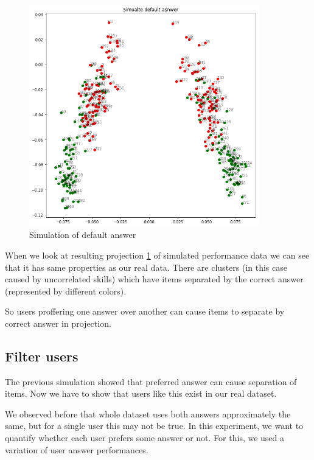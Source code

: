 \documentclass[
  digital, %
  table,   %
  nolof,     %
  nolot,     %
  nocover
]{fithesis3}
\begin{document}
\begin{figure}
  \includegraphics[width=10cm]{img/simulated_default}
  \caption{Simulation of default answer}
  \label{fig:simulated_default}
\end{figure}

When we look at resulting projection \ref{fig:simulated_default} of simulated performance data we can see that it has same properties as our real data. There are clusters (in this case caused by uncorrelated skills) which have items separated by the correct answer (represented by different colors).


So users proffering one answer over another can cause items to separate by correct answer in projection.


\subsection{Filter users}\label{filter-users}


The previous simulation showed that preferred answer can cause separation of items. Now we have to show that users like this exist in our real dataset.

We observed before that whole dataset uses both answers approximately the same, but for a single user this may not be true. In this experiment, we want to quantify whether each user prefers some answer or not. For this, we used a variation of user answer performances.
\end{document}
